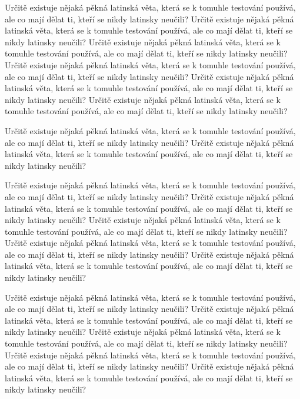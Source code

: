 \documentclass[11pt,twoside,a4paper]{book}
\begin{document}
Určitě existuje nějaká pěkná latinská věta, která se k tomuhle testování používá, ale co mají dělat ti, kteří se nikdy latinsky neučili? Určitě existuje nějaká pěkná latinská věta, která se k tomuhle testování používá, ale co mají dělat ti, kteří se nikdy latinsky neučili? Určitě existuje nějaká pěkná latinská věta, která se k tomuhle testování používá, ale co mají dělat ti, kteří se nikdy latinsky neučili? Určitě existuje nějaká pěkná latinská věta, která se k tomuhle testování používá, ale co mají dělat ti, kteří se nikdy latinsky neučili? Určitě existuje nějaká pěkná latinská věta, která se k tomuhle testování používá, ale co mají dělat ti, kteří se nikdy latinsky neučili? Určitě existuje nějaká pěkná latinská věta, která se k tomuhle testování používá, ale co mají dělat ti, kteří se nikdy latinsky neučili?

Určitě existuje nějaká pěkná latinská věta, která se k tomuhle testování používá, ale co mají dělat ti, kteří se nikdy latinsky neučili? Určitě existuje nějaká pěkná latinská věta, která se k tomuhle testování používá, ale co mají dělat ti, kteří se nikdy latinsky neučili?

Určitě existuje nějaká pěkná latinská věta, která se k tomuhle testování používá, ale co mají dělat ti, kteří se nikdy latinsky neučili? Určitě existuje nějaká pěkná latinská věta, která se k tomuhle testování používá, ale co mají dělat ti, kteří se nikdy latinsky neučili? Určitě existuje nějaká pěkná latinská věta, která se k tomuhle testování používá, ale co mají dělat ti, kteří se nikdy latinsky neučili? Určitě existuje nějaká pěkná latinská věta, která se k tomuhle testování používá, ale co mají dělat ti, kteří se nikdy latinsky neučili? Určitě existuje nějaká pěkná latinská věta, která se k tomuhle testování používá, ale co mají dělat ti, kteří se nikdy latinsky neučili?

Určitě existuje nějaká pěkná latinská věta, která se k tomuhle testování používá, ale co mají dělat ti, kteří se nikdy latinsky neučili? Určitě existuje nějaká pěkná latinská věta, která se k tomuhle testování používá, ale co mají dělat ti, kteří se nikdy latinsky neučili? Určitě existuje nějaká pěkná latinská věta, která se k tomuhle testování používá, ale co mají dělat ti, kteří se nikdy latinsky neučili? Určitě existuje nějaká pěkná latinská věta, která se k tomuhle testování používá, ale co mají dělat ti, kteří se nikdy latinsky neučili? Určitě existuje nějaká pěkná latinská věta, která se k tomuhle testování používá, ale co mají dělat ti, kteří se nikdy latinsky neučili?
\end{document}
